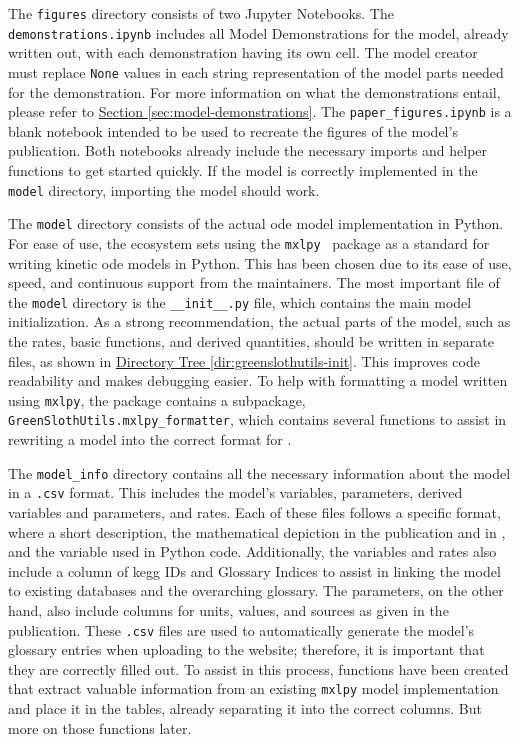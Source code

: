 The \verb|figures| directory consists of two Jupyter Notebooks. The \verb|demonstrations.ipynb| includes all Model Demonstrations for the model, already written out, with each demonstration having its own cell. The model creator must replace \verb|None| values in each string representation of the model parts needed for the demonstration. For more information on what the demonstrations entail, please refer to \hyperref[sec:model-demonstrations]{Section \ref*{sec:model-demonstrations}}. The \verb|paper_figures.ipynb| is a blank notebook intended to be used to recreate the figures of the model's publication. Both notebooks already include the necessary imports and helper functions to get started quickly. If the model is correctly implemented in the \verb|model| directory, importing the model should work.

The \verb|model| directory consists of the actual \gls{ode} model implementation in Python. For ease of use, the \greensloth{} ecosystem sets using the \verb|mxlpy|~\cite{vanaalstMxlPyPythonPackage2025} package as a standard for writing kinetic \gls{ode} models in Python. This has been chosen due to its ease of use, speed, and continuous support from the maintainers. The most important file of the \verb|model| directory is the \verb|__init__.py| file, which contains the main model initialization. As a strong recommendation, the actual parts of the model, such as the rates, basic functions, and derived quantities, should be written in separate files, as shown in \hyperref[dir:greenslothutils-init]{Directory Tree \ref*{dir:greenslothutils-init}}. This improves code readability and makes debugging easier. To help with formatting a model written using \verb|mxlpy|, the \greensloth[GreenSlothUtils] package contains a subpackage, \verb|GreenSlothUtils.mxlpy_formatter|, which contains several functions to assist in rewriting a model into the correct format for \greensloth{}.

The \verb|model_info| directory contains all the necessary information about the model in a \verb|.csv| format. This includes the model's variables, parameters, derived variables and parameters, and rates. Each of these files follows a specific format, where a short description, the mathematical depiction in the publication and in \greensloth{}, and the variable used in Python code. Additionally, the variables and rates also include a column of \gls{kegg} IDs and Glossary Indices to assist in linking the model to existing databases and the \greensloth{} overarching glossary. The parameters, on the other hand, also include columns for units, values, and sources as given in the publication. These \verb|.csv| files are used to automatically generate the model's glossary entries when uploading to the \greensloth{} website; therefore, it is important that they are correctly filled out. To assist in this process, functions have been created that extract valuable information from an existing \verb|mxlpy| model implementation and place it in the tables, already separating it into the correct columns. But more on those functions later.

